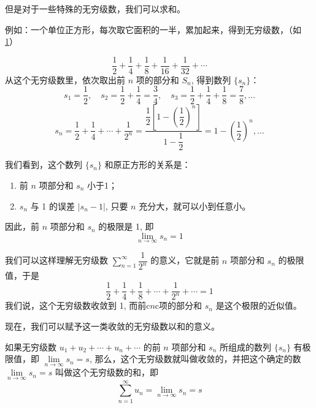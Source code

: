 但是对于一些特殊的无穷级数，我们可以求和。

例如：一个单位正方形，每次取它面积的一半，累加起来，得到无穷级数，（如 \cref{fig:square}）
\begin{figure}
  \caption{}\label{fig:square}
\end{figure}
\[\frac{1}{2}+\frac{1}{4}+\frac{1}{8}+\frac{1}{16}+\frac{1}{32}+\cdots\]
从这个无穷级数里，依次取出前 $n$ 项的部分和 $S_n$, 得到数列 $\{s_n\}$：
\[s_1=\frac{1}{2},\quad s_2=\frac{1}{2}+\frac{1}{4}=\frac{3}{4},\quad s_3=\frac{1}{2}+\frac{1}{4}+\frac{1}{8}=\frac{7}{8},\ldots\]
\[s_n=\frac{1}{2}+\frac{1}{4}+\cdots+\frac{1}{2^n}=\frac{\dfrac{1}{2}\left[1-\left(\dfrac{1}{2}\right)^n\right]}{1-\dfrac{1}{2}}=1-\left(\frac{1}{2}\right)^n,\ldots\]

我们看到，这个数列 $\{s_n\}$ 和原正方形的关系是：
\begin{enumerate}
  \item 前 $n$ 项部分和 $s_n$ 小于1；
  \item $s_n$ 与 1 的误差 $|s_n-1|$, 只要 $n$ 充分大，就可以小到任意小。
\end{enumerate}
因此，前 $n$ 项部分和 $s_n$ 的极限是 1, 即
\[\lim_{n\to\infty} s_n=1 \]

我们可以这样理解无穷级数 $\sum\limits_{n=1}^{\infty}\dfrac{1}{2^n}$ 的意义，它就是前 $n$ 项部分和 $s_n$ 的极限值，于是
\[\frac{1}{2}+\frac{1}{4}+\frac{1}{8}+\cdots+\frac{1}{2^n}+\cdots=1 \]
我们说，这个无穷级数收敛到 1, 而前c$n$c项的部分和 $s_n$ 是这个极限的近似值。

现在，我们可以赋予这一类收敛的无穷级数以和的意义。

\begin{Definition}
  如果无穷级数 $u_1+u_2+\cdots+u_n+\cdots$ 的前 $n$ 项部分和 $s_n$ 所组成的数列 $\{s_n\}$ 有极限值，即 $\lim\limits_{n\to\infty}s_n=s$, 那么，这个无穷级数就叫做收敛的，并把这个确定的数 $\lim\limits_{n\to\infty}s_n=s$ 叫做这个无穷级数的和，即
\[\sum_{n=1}^{\infty}u_n=\lim_{n\to\infty}s_n=s\]
\end{Definition}
 
